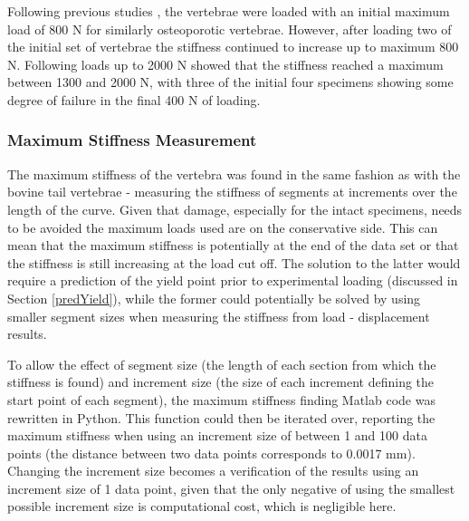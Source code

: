 Following previous studies \cite{Wijayathunga2008}, the vertebrae were loaded
with an initial maximum load of 800 N for similarly osteoporotic vertebrae.
However, after loading two of the initial set of vertebrae the stiffness
continued to increase up to maximum 800 N. Following loads up to 2000 N showed
that the stiffness reached a maximum between 1300 and 2000 N, with three of the
initial four specimens showing some degree of failure in the final 400 N of
loading.

\subsubsection{Maximum Stiffness Measurement}

The maximum stiffness of the vertebra was found in the same fashion as with the
bovine tail vertebrae - measuring the stiffness of segments at increments over
the length of the curve. Given that damage, especially for the intact specimens,
needs to be avoided the maximum loads used are on the conservative side. This
can mean that the maximum stiffness is potentially at the end of the data set or
that the stiffness is still increasing at the load cut off. The solution to the
latter would require a prediction of the yield point prior to experimental
loading (discussed in Section \ref{predYield}), while the former could
potentially be solved by using smaller segment sizes when measuring the
stiffness from load - displacement results.

To allow the effect of segment size (the length of each section from which the
stiffness is found) and increment size (the size of each increment defining the
start point of each segment), the maximum stiffness finding Matlab code was
rewritten in Python. This function could then be iterated over, reporting the
maximum stiffness when using an increment size of between 1 and 100 data points
(the distance between two data points corresponds to 0.0017 mm). Changing the
increment size becomes a verification of the results using an increment size of
1 data point, given that the only negative of using the smallest possible
increment size is computational cost, which is negligible here.

